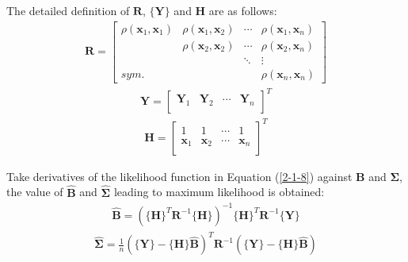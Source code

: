 \documentclass[12pt]{extbook}
\begin{document}
The detailed definition of $\bm{R}$, $\{\bm{Y}\}$ and $\bm{H}$ are as follows:
\begin{equation}
\begin{split}
\bm{R} =
\left [ \begin{array}{cccc}
\rho(\bm{x}_1, \bm{x}_1) & \rho(\bm{x}_1, \bm{x}_2) & \cdots & \rho(\bm{x}_1, \bm{x}_n)\\
 & \rho(\bm{x}_2, \bm{x}_2)& \cdots & \rho(\bm{x}_2, \bm{x}_n) \\
 &  & \ddots & \vdots\\
sym. &  &  & \rho(\bm{x}_n,\bm{x}_n)
\end{array}\right ]
\end{split}
\label{2-1-9}
\end{equation}
\begin{equation}
\begin{split}
\bm{Y} =
\left [ \begin{array}{cccc}
\bm{Y}_1 & \bm{Y}_2 & \cdots & \bm{Y}_n\\
\end{array}\right ]^T
\end{split}
\label{2-1-10}
\end{equation}
\begin{equation}
\begin{split}
\bm{H} =
\left [ \begin{array}{cccc}
1 & 1 & \cdots & 1\\
\bm{x}_1 & \bm{x}_2 & \cdots & \bm{x}_n \\
\end{array}\right ]^T
\end{split}
\label{2-1-11}
\end{equation}

Take derivatives of the likelihood function in Equation (\ref{2-1-8}) against $\bm{B}$ and $\bm{\Sigma}$, the value of $\hat{\bm{B}}$ and $\hat{\bm{\Sigma}}$ leading to maximum likelihood is obtained:
\begin{equation}
\begin{split}
\hat{\bm{B}} = (\{\bm{H}\}^T\bm{R}^{-1}\{\bm{H}\})^{-1}\{\bm{H}\}^T\bm{R}^{-1}\{\bm{Y}\}
\end{split}
\label{2-1-12}
\end{equation}
\begin{equation}
\begin{split}
\hat{\bm{\Sigma}} = \frac{1}{n}(\{\bm{Y}\} - \{\bm{H}\}\hat{\bm{B}})^T\bm{R}^{-1}(\{\bm{Y}\} - \{\bm{H}\}\hat{\bm{B}})
\end{split}
\label{2-1-13}
\end{equation}
\end{document}
